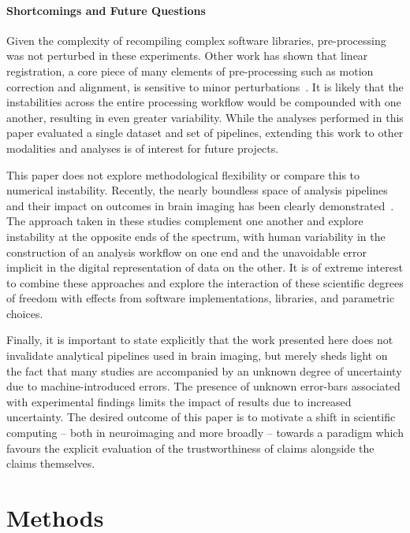 \documentclass[fleqn,10pt]{SelfArx} %
\begin{document}
\paragraph{Shortcomings and Future Questions}
Given the complexity of recompiling complex software libraries, pre-processing was not perturbed in these experiments.
Other work has shown that linear registration, a core piece of many elements of pre-processing such as motion
correction and alignment, is sensitive to minor perturbations~\cite{Glatard2015-vc}. It is likely that the
instabilities across the entire processing workflow would be compounded with one another, resulting in even greater
variability. While the analyses performed in this paper evaluated a single dataset and set of pipelines, extending this
work to other modalities and analyses is of interest for future projects.

This paper does not explore methodological flexibility or compare this to numerical instability. Recently, the nearly
boundless space of analysis pipelines and their impact on outcomes in brain imaging has been clearly
demonstrated~\cite{botvinik2020variability}. The approach taken in these studies complement one another and explore
instability at the opposite ends of the spectrum, with human variability in the construction of an analysis workflow on
one end and the unavoidable error implicit in the digital representation of data on the other. It is of extreme
interest to combine these approaches and explore the interaction of these scientific degrees of freedom with effects
from software implementations, libraries, and parametric choices.

Finally, it is important to state explicitly that the work presented here does not invalidate analytical pipelines used
in brain imaging, but merely sheds light on the fact that many studies are accompanied by an unknown degree of
uncertainty due to machine-introduced errors. The presence of unknown error-bars associated with experimental findings
limits the impact of results due to increased uncertainty. The desired outcome of this paper is to motivate a shift in
scientific computing – both in neuroimaging and more broadly – towards a paradigm which favours the explicit evaluation
of the trustworthiness of claims alongside the claims themselves.

\newpage
\section*{Methods}
\end{document}
